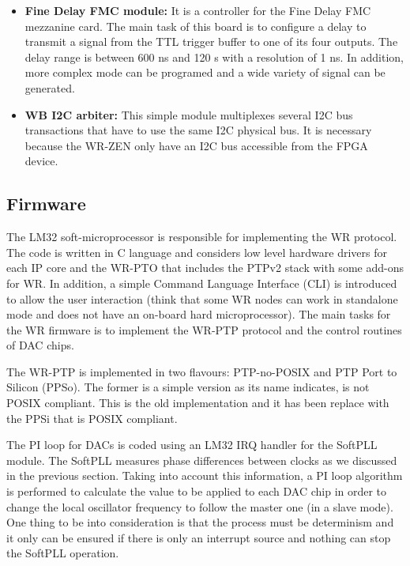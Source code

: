 \documentclass[review]{elsarticle}
\begin{document}
\begin{itemize}
{	%
	}
	\item{\textbf{Fine Delay FMC module:} It is a controller for the Fine Delay FMC mezzanine card. The main task of this board is to configure a delay to transmit a signal from the TTL trigger buffer to one of its four outputs. The delay range is between 600 ns and 120 s with a resolution of 1 ns. In addition, more complex mode can be programed and a wide variety of signal can be generated.}
	\item{\textbf{WB I2C arbiter:} This simple module multiplexes several I2C bus transactions that have to use the same I2C physical bus. It is necessary because the WR-ZEN only have an I2C bus accessible from the FPGA device.}
\end{itemize}

\subsection{Firmware}

The LM32 soft-microprocessor is responsible for implementing the WR protocol. The code is written in C language and considers low level hardware drivers for each IP core and the WR-PTO that includes the PTPv2 stack with some add-ons for WR. In addition, a simple Command Language Interface (CLI) is introduced to allow the user interaction (think that some WR nodes can work in standalone mode and does not have an on-board hard microprocessor). The main tasks for the WR firmware is to implement the WR-PTP protocol and the control routines of DAC chips. 

The WR-PTP is implemented in two flavours: PTP-no-POSIX and PTP Port to Silicon (PPSo). The former is a simple version as its name indicates, is not POSIX compliant. This is the old implementation and it has been replace with the PPSi that is POSIX compliant.

The PI loop for DACs is coded using an LM32 IRQ handler for the SoftPLL module. The SoftPLL measures phase differences between clocks as we discussed in the previous section. Taking into account this information, a PI loop algorithm is performed to calculate the value to be applied to each DAC chip in order to change the local oscillator frequency to follow the master one (in a slave mode). One thing to be into consideration is that the process must be determinism and it only can be ensured if there is only an interrupt source and nothing can stop the SoftPLL operation.
\end{document}
